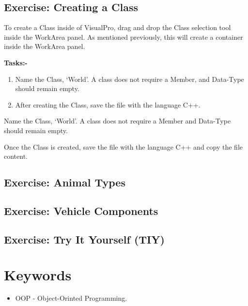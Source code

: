 \documentclass[10pt]{article}
\begin{document}
    \newpage
    \subsection{Exercise: Creating a Class}
        To create a Class inside of VisualPro, drag and drop the Class selection tool inside the WorkArea panel. As mentioned previously, this will create a container inside the WorkArea panel.

        \textbf{Tasks:-}
        \begin{enumerate}
            \item Name the Class, `World'. A class does not require a Member, and Data-Type should remain empty.
            \item After creating the Class, save the file with the language C++.
        \end{enumerate}
        Name the Class, `World'. A class does not require a Member and Data-Type should remain empty.

        Once the Class is created, save the file with the language C++ and copy the file content.

    \subsection{Exercise: Animal Types}

    \subsection{Exercise: Vehicle Components}

    \subsection{Exercise: Try It Yourself (TIY)}

\section{Keywords}
\label{sec:keywords}
    \begin{itemize}
        \item OOP - Object-Orinted Programming.
    \end{itemize}

\clearpage
\nocite{*}
\small{
}
\end{document}
